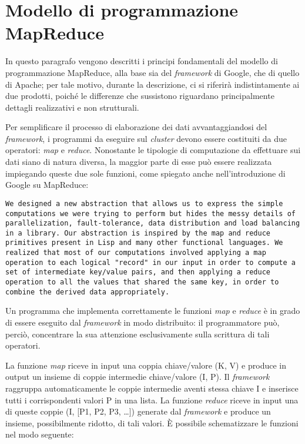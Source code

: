 \section{Modello di programmazione MapReduce}
\label{par:hadoopmodel}

In questo paragrafo vengono descritti i principi fondamentali del modello di programmazione MapReduce, alla base sia del \textit{framework} di Google, che di quello di Apache; per tale motivo, 
durante la descrizione, ci si riferirà indistintamente ai due prodotti, poiché le differenze che sussistono riguardano principalmente dettagli realizzativi e non strutturali.

Per semplificare il processo di elaborazione dei dati avvantaggiandosi del \textit{framework}, i programmi da eseguire sul \textit{cluster} devono essere costituiti da due operatori: \textit{map} e \textit{reduce}. 
Nonostante le tipologie di computazione da effettuare sui dati siano di natura diversa, la maggior parte di esse può essere realizzata impiegando queste due sole funzioni, come 
spiegato anche nell’introduzione di Google su MapReduce:

\begin{lstlisting}[breaklines]
We designed a new abstraction that allows us to express the simple computations we were trying to perform but hides the messy details of parallelization, fault-tolerance, data distribution and load balancing in a library. Our abstraction is inspired by the map and reduce primitives present in Lisp and many other functional languages. We realized that most of our computations involved applying a map operation to each logical "record" in our input in order to compute a set of intermediate key/value pairs, and then applying a reduce operation to all the values that shared the same key, in order to combine the derived data appropriately.
\end{lstlisting}

Un programma che implementa correttamente le funzioni \textit{map} e \textit{reduce} è in grado di essere eseguito dal \textit{framework} in modo distribuito: il programmatore può, perciò, concentrare la 
sua attenzione esclusivamente sulla scrittura di tali operatori.

La funzione \textit{map} riceve in input una coppia chiave/valore (K, V) e produce in output un insieme di coppie intermedie chiave/valore (I, P). Il \textit{framework} raggruppa automaticamente 
le coppie intermedie aventi stessa chiave I e inserisce tutti i corrispondenti valori P in una lista. La funzione \textit{reduce} riceve in input una di queste coppie (I, [P1, P2, P3, …]) 
generate dal \textit{framework} e produce un insieme, possibilmente ridotto, di tali valori. È possibile schematizzare le funzioni nel modo seguente:


